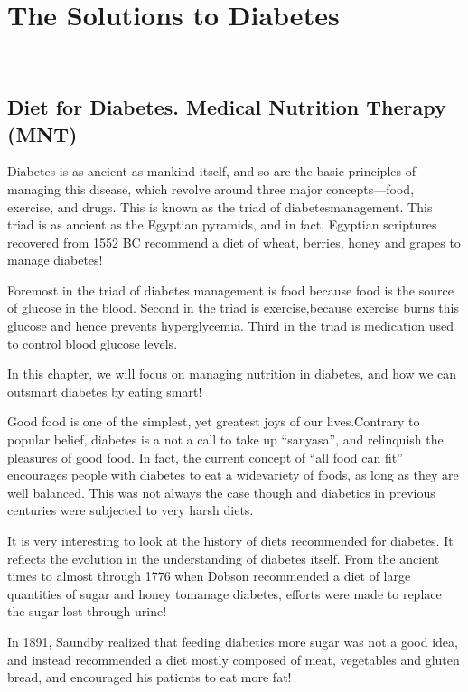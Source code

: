 
\part{The Solutions to Diabetes}

\newpage
~\phantom{a}
\thispagestyle{empty}
\newpage

\chapter{Diet for Diabetes. Medical Nutrition Therapy (MNT)}\label{chap22}

Diabetes is as ancient as mankind itself, and so are the basic principles of managing this disease, which revolve around three major concepts—food, exercise, and drugs. This is known as the triad of diabetes\break management. This triad is as ancient as the Egyptian pyramids, and in fact, Egyptian scriptures recovered from 1552 BC recommend a diet of wheat, berries, honey and grapes to manage diabetes!

Foremost in the triad of diabetes management is food because food is the source of glucose in the blood. Second in the triad is exercise,\break because exercise burns this glucose and hence prevents hyperglycemia. Third in the triad is medication used to control blood glucose levels.

In this chapter, we will focus on managing nutrition in diabetes, and how we can outsmart diabetes by eating smart!

Good food is one of the simplest, yet greatest joys of our lives.\break Contrary to popular belief, diabetes is a not a call to take up “sanyasa”, and relinquish the pleasures of good food. In fact, the current concept of “all food can fit” encourages people with diabetes to eat a wide\break variety of foods, as long as they are well balanced. This was not always the case though and diabetics in previous centuries were subjected to very harsh diets.


It is very interesting to look at the history of diets recommended for diabetes. It reflects the evolution in the understanding of diabetes itself. From the ancient times to almost through 1776 when Dobson recommended a diet of large quantities of sugar and honey to\break manage diabetes, efforts were made to replace the sugar lost through urine!

In 1891, Saundby realized that feeding diabetics more sugar was not a good idea, and instead recommended a diet mostly composed of meat, vegetables and gluten bread, and encouraged his patients to eat more fat!

